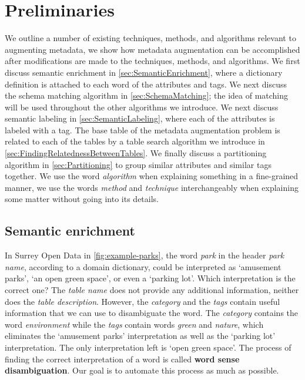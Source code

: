 
\chapter{Preliminaries}
\label{ch:Preliminaries}

We outline a number of existing techniques, methods, and algorithms relevant to augmenting metadata, we show how metadata augmentation can be accomplished after modifications are made to the techniques, methods, and algorithms. We first discuss semantic enrichment in \autoref{sec:SemanticEnrichment}, where a dictionary definition is attached to each word of the attributes and tags. We next discuss the schema matching algorithm in \autoref{sec:SchemaMatching}; the idea of matching will be used throughout the other algorithms we introduce. We next discuss semantic labeling in \autoref{sec:SemanticLabeling}, where each of the attributes is labeled with a tag. The base table of the metadata augmentation problem is related to each of the tables by a table search algorithm we introduce in \autoref{sec:FindingRelatednessBetweenTables}. We finally discuss a partitioning algorithm in \autoref{sec:Partitioning} to group similar attributes and similar tags together. We use the word \textit{algorithm} when explaining something in a fine-grained manner, we use the words \textit{method} and \textit{technique} interchangeably when explaining some matter without going into its details.

\section{Semantic enrichment}
\label{sec:SemanticEnrichment}

In Surrey Open Data in \autoref{fig:example-parks}, the word \textit{park} in the header \textit{park name}, according to a domain dictionary, could be interpreted as `amusement parks', `an open green space', or even a `parking lot'. Which interpretation is the correct one? The \textit{table name} does not provide any additional information, neither does the \textit{table description}. However, the \textit{category} and the \textit{tags} contain useful information that we can use to disambiguate the word. The \textit{category} contains the word \textit{environment} while the \textit{tags} contain words \textit{green} and \textit{nature}, which eliminates the `amusement parks' interpretation as well as the `parking lot' interpretation. The only interpretation left is `open green space'. The process of finding the correct interpretation of a word is called \textbf{\gls{word sense disambiguation}}. Our goal is to automate this process as much as possible.

